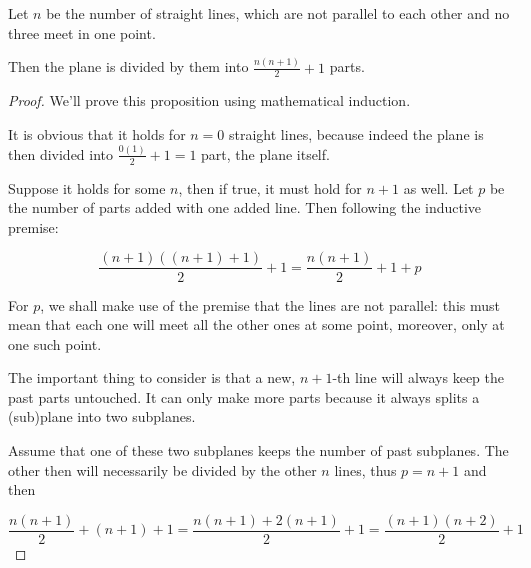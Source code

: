 \documentclass{article}
\title{}
\author{Adam Fiedler}
\date{August 6, 2018}
\begin{document}
\maketitle

Let $n$ be the number of straight lines, which are not parallel to each other and no three meet in one point. 

Then the plane is divided by them into $\frac{n (n + 1)}{2} + 1$ parts.

\begin{proof}

We'll prove this proposition using mathematical induction.

It is obvious that it holds for $n = 0$ straight lines, because indeed the plane is then divided into $\frac{0 (1)}{2} + 1 = 1$ part, the plane itself. 

Suppose it holds for some $n$, then if true, it must hold for $n + 1$ as well. Let $p$ be the number of parts added with one added line. Then following the inductive premise:

\[ \frac{(n + 1) ((n + 1) + 1)}{2} + 1 = \frac{n (n + 1)}{2} + 1 + p \]

For $p$, we shall make use of the premise that the lines are not parallel: this must mean that each one will meet all the other ones at some point, moreover, only at one such point.

The important thing to consider is that a new, $n+1$-th line will always keep the past parts untouched. It can only make more parts because it always splits a (sub)plane into two subplanes. 

Assume that one of these two subplanes keeps the number of past subplanes. The other then will necessarily be divided by the other $n$ lines, thus $p = n + 1$ and then 

\[ \frac{n (n + 1)}{2} + (n + 1) + 1 = \frac{n (n + 1) + 2 (n+1)}{2} + 1 = \frac{(n + 1)(n + 2)}{2} + 1 \]

\end{proof}
\end{document}
